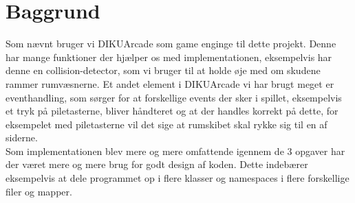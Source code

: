 \section{Baggrund}
Som nævnt bruger vi DIKUArcade som game enginge til dette projekt. Denne har mange funktioner der hjælper os med implementationen, eksempelvis har denne en collision-detector, som vi bruger til at holde øje med om skudene rammer rumvæsnerne. Et andet element i DIKUArcade vi har brugt meget er eventhandling, som sørger for at forskellige events der sker i spillet, eksempelvis et tryk på piletasterne, bliver håndteret og at der handles korrekt på dette, for eksempelet med piletasterne vil det sige at rumskibet skal rykke sig til en af siderne.\\
Som implementationen blev mere og mere omfattende igennem de 3 opgaver har der været mere og mere brug for godt design af koden. Dette indebærer eksempelvis at dele programmet op i flere klasser og namespaces i flere forskellige filer og mapper.   
